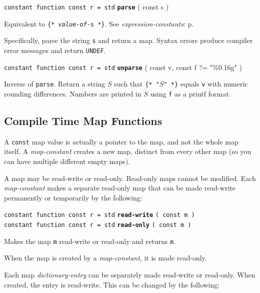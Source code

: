 \documentclass[12pt]{article}
\newcommand{\ttkey}[1]{{\tt \bfseries #1}}
\newcommand{\pagref}[1]{p\pageref{#1}}
\newenvironment{indpar}[1][0.3in]%
	{\begin{list}{}%
		     {\setlength{\itemsep}{0in}%
		      \setlength{\topsep}{0in}%
		      \setlength{\parsep}{1ex}%
		      \setlength{\labelwidth}{#1}%
		      \setlength{\leftmargin}{#1}%
		      \addtolength{\leftmargin}{\labelsep}}%
	 \item}%
	{\end{list}}
\begin{document}
{\tt constant function const r = std} \ttkey{parse} ( const s  )
\begin{indpar}
Equivalent to {\tt \{* {\rm \em value-of-}s *\}}.
See {\em expression-constants}: \pagref{EXPRESSION-CONSTANT}.

Specifically, parse the string {\tt s} and return a map.
Syntax errors produce compiler error messages and
return {\tt UNDEF}.
\end{indpar}

{\tt constant function const r = std} \ttkey{unparse}
	( const v, const f ?= "\%0.16g"  )
\begin{indpar}
Inverse of {\tt parse}.  Return a string $S$ such
that {\tt \{* "$S$" *\}} equals {\tt v} with numeric rounding differences.
Numbers are printed in $S$ using {\tt f} as a printf format.
\end{indpar}

\subsection{Compile Time Map Functions}

A {\tt const} map value is actually a pointer to the map,
and not the whole map itself.
A {\em map-constant} creates a new map, distinct from every
other map (so you can have multiple different empty maps).

A map may be read-write or read-only.\label{READ-ONLY-MAP}
Read-only maps cannot
be modified.  Each {\em map-constant} makes a separate read-only
map that can be made read-write permanently or temporarily by
the following:

{\tt constant function const r = std} \ttkey{read-write} {\tt ( const m )} \\
{\tt constant function const r = std} \ttkey{read-only} {\tt ( const m )}
\begin{indpar}
Makes the map {\tt m} read-write or read-only and returns {\tt m}.

When the map is created by a {\em map-constant}, it is made read-only.
\end{indpar}

Each map {\em dictionary-entry} can be separately made read-write or
read-only.  When created, the entry is read-write.  This can be
changed by the following:
\end{document}
